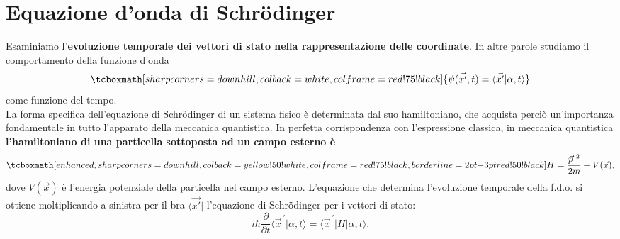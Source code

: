 \documentclass[a4paper,12pt,oneside]{book}
\begin{document}
\section[ Equazione d'onda di Schrödinger]{Equazione d'onda di Schr\"{o}dinger}
Esaminiamo l'\textbf{evoluzione temporale dei vettori di stato nella rappresentazione delle coordinate}. In altre parole studiamo il comportamento della funzione d'onda
	\begin{equation}
		\tcboxmath[sharp corners=downhill, colback=white, colframe=red!75!black]{
		\psi (\vec{x'}, t) = \langle \vec{x'}\vert \alpha, t \rangle
		}
	\end{equation}
come funzione del tempo.\\

La forma specifica dell'equazione di Schr\"{o}dinger di un sistema fisico è determinata dal suo hamiltoniano, che acquista perciò un'importanza fondamentale in tutto l'apparato della meccanica quantistica. In perfetta corrispondenza con l'espressione classica, in meccanica quantistica \textbf{l'hamiltoniano di una particella sottoposta ad un campo esterno è}
	\begin{equation}
		\tcboxmath[enhanced, sharp corners=downhill, colback=yellow!50!white, colframe=red!75!black, borderline={2pt}{-3pt}{red!50!black}]{
			H= \frac{\vec{p}^{\ 2}}{2m}+V(\vec{x}),
			}
	\label{eq:cap8_5}
	\end{equation}
dove $V(\vec{x})$ è l'energia potenziale della particella nel campo esterno.		
L'equazione che determina l'evoluzione temporale della f.d.o. si ottiene moltiplicando a sinistra per il bra $\langle \vec{x'}\vert $ l'equazione di Schr\"{o}dinger per i vettori di stato:
	\begin{equation}
		i\hbar \frac{\partial}{\partial t} \langle {\vec{x}}^{\, \prime}\vert \alpha , t \rangle = \langle {\vec{x}}^{\, \prime}\vert H \vert \alpha , t \rangle.
	\end{equation}\\
	
\end{document}
